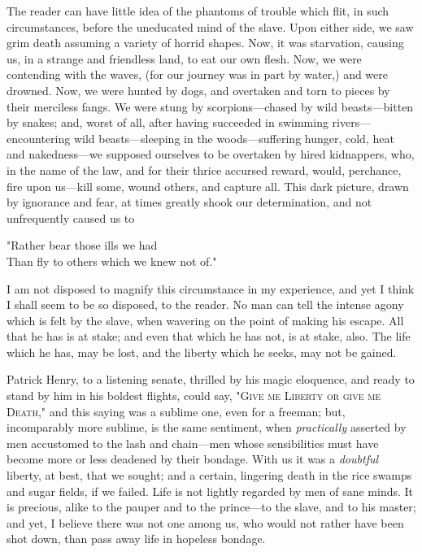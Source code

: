 The reader can have little idea of the phantoms of trouble which flit,
in such circumstances, before the uneducated mind of the slave. Upon
either side, we saw grim death assuming a variety of horrid shapes. Now,
it was starvation, causing us, in a strange and friendless land, to eat
our own flesh. Now, we were contending with the waves, (for our journey
was in part by water,) and were drowned. Now, we were hunted by dogs,
and overtaken and torn to pieces by their merciless fangs. We were stung
by scorpions---chased by wild beasts---bitten by snakes; and, worst of
all, after having succeeded in swimming rivers---encountering wild
beasts---sleeping in the woods---suffering hunger, cold, heat and
nakedness---we supposed ourselves to be overtaken by hired kidnappers,
who, in the name of the law, and for their thrice accursed reward,
would, perchance, fire upon us---kill some, wound others, and capture
all. This dark picture, drawn by ignorance and fear, at times greatly
shook our determination, and not unfrequently caused us to

{"}Rather bear those ills we had\\
Than fly to others which we knew not of."

I am not disposed to magnify this circumstance in my experience, and yet
I think I shall seem to be so {}disposed, to the reader. No man can tell
the intense agony which is felt by the slave, when wavering on the point
of making his escape. All that he has is at stake; and even that which
he has not, is at stake, also. The life which he has, may be lost, and
the liberty which he seeks, may not be gained.

Patrick Henry, to a listening senate, thrilled by his magic eloquence,
and ready to stand by him in his boldest flights, could say,
"\textsc{Give me Liberty or give me Death}," and this saying was a
sublime one, even for a freeman; but, incomparably more sublime, is the
same sentiment, when \emph{practically} asserted by men accustomed to
the lash and chain---men whose sensibilities must have become more or
less deadened by their bondage. With us it was a \emph{doubtful}
liberty, at best, that we sought; and a certain, lingering death in the
rice swamps and sugar fields, if we failed. Life is not lightly regarded
by men of sane minds. It is precious, alike to the pauper and to the
prince---to the slave, and to his master; and yet, I believe there was
not one among us, who would not rather have been shot down, than pass
away life in hopeless bondage.

